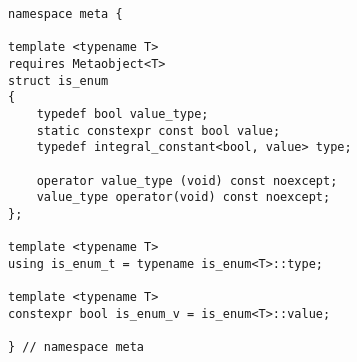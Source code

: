 
\begin{verbatim}
namespace meta {

template <typename T>
requires Metaobject<T>
struct is_enum
{
	typedef bool value_type;
	static constexpr const bool value;
	typedef integral_constant<bool, value> type;

	operator value_type (void) const noexcept;
	value_type operator(void) const noexcept;
};

template <typename T>
using is_enum_t = typename is_enum<T>::type;

template <typename T>
constexpr bool is_enum_v = is_enum<T>::value;

} // namespace meta
\end{verbatim}
